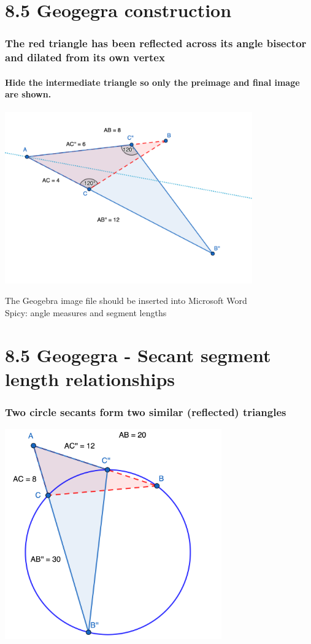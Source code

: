 \documentclass{beamer}
\begin{document}
\section{8.5 Geogegra construction}
  \frame
  {
    \frametitle{The red triangle has been reflected across its angle bisector and dilated from its own vertex}
    \framesubtitle{Hide the intermediate triangle so only the preimage and final image are shown.}

    \includegraphics[width=0.8\textwidth]{8-6Similar-Triangle-Reflection.png}

    The Geogebra image file should be inserted into Microsoft Word\\
    Spicy: angle measures and segment lengths
  }

\section{8.5 Geogegra - Secant segment length relationships}
  \frame
  {
    \frametitle{Two circle secants form two similar (reflected) triangles}

    \includegraphics[width=0.7\textwidth]{8-6Similar-Triangle-Circle.png}
  }
\end{document}
